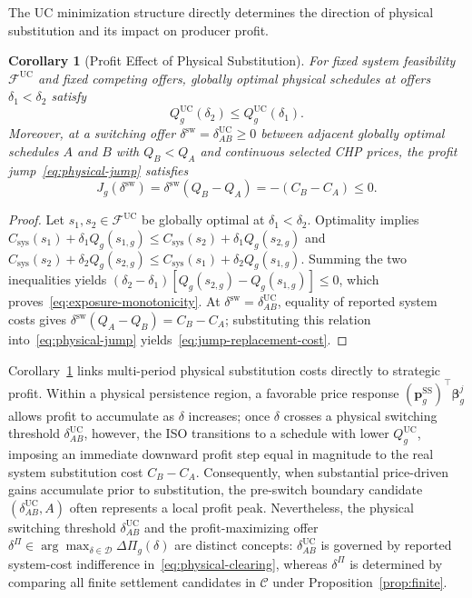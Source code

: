 \documentclass[journal]{IEEEtran}
\newtheorem{corollary}{Corollary}
\newcommand{\bp}{\bm p}
\newcommand{\UC}{\mathrm{UC}}
\newcommand{\SSched}{\mathrm{SS}}
\begin{document}
The UC minimization structure directly determines the direction of physical substitution and its impact on producer profit.

\begin{corollary}[Profit Effect of Physical Substitution]
\label{cor:exposure}
For fixed system feasibility $\mathcal{F}^{\UC}$ and fixed competing offers, globally optimal physical schedules at offers $\delta_1<\delta_2$ satisfy
\begin{equation}
Q_g^{\UC}(\delta_2) \le Q_g^{\UC}(\delta_1).\label{eq:exposure-monotonicity}
\end{equation}
Moreover, at a switching offer $\delta^{\mathrm{sw}}=\delta_{AB}^{\UC}\ge 0$ between adjacent globally optimal schedules $A$ and $B$ with $Q_B<Q_A$ and continuous selected CHP prices, the profit jump~\eqref{eq:physical-jump} satisfies
\begin{equation}
J_g(\delta^{\mathrm{sw}})
= \delta^{\mathrm{sw}}(Q_B - Q_A)
= -(C_B - C_A) \le 0.\label{eq:jump-replacement-cost}
\end{equation}
\end{corollary}

\begin{proof}
Let $s_1,s_2\in\mathcal{F}^{\UC}$ be globally optimal at $\delta_1<\delta_2$. Optimality implies $C_{\mathrm{sys}}(s_1)+\delta_1 Q_g(s_{1,g})\le C_{\mathrm{sys}}(s_2)+\delta_1 Q_g(s_{2,g})$ and $C_{\mathrm{sys}}(s_2)+\delta_2 Q_g(s_{2,g})\le C_{\mathrm{sys}}(s_1)+\delta_2 Q_g(s_{1,g})$. Summing the two inequalities yields $(\delta_2-\delta_1)[Q_g(s_{2,g})-Q_g(s_{1,g})]\le 0$, which proves~\eqref{eq:exposure-monotonicity}. At $\delta^{\mathrm{sw}}=\delta_{AB}^{\UC}$, equality of reported system costs gives $\delta^{\mathrm{sw}}(Q_A-Q_B)=C_B-C_A$; substituting this relation into~\eqref{eq:physical-jump} yields~\eqref{eq:jump-replacement-cost}.
\end{proof}

Corollary~\ref{cor:exposure} links multi-period physical substitution costs directly to strategic profit. Within a physical persistence region, a favorable price response $(\bp_g^{\SSched})^\top\bm{\beta}_g^j$ allows profit to accumulate as $\delta$ increases; once $\delta$ crosses a physical switching threshold $\delta_{AB}^{\UC}$, however, the ISO transitions to a schedule with lower $Q_g^{\UC}$, imposing an immediate downward profit step equal in magnitude to the real system substitution cost $C_B-C_A$. Consequently, when substantial price-driven gains accumulate prior to substitution, the pre-switch boundary candidate $(\delta_{AB}^{\UC},A)$ often represents a local profit peak. Nevertheless, the physical switching threshold $\delta_{AB}^{\UC}$ and the profit-maximizing offer $\delta^{\Pi}\in\arg\max\nolimits_{\delta\in\mathcal{D}}\Delta\Pi_g(\delta)$ are distinct concepts: $\delta_{AB}^{\UC}$ is governed by reported system-cost indifference in~\eqref{eq:physical-clearing}, whereas $\delta^{\Pi}$ is determined by comparing all finite settlement candidates in $\mathcal{C}$ under Proposition~\ref{prop:finite}.
\end{document}
